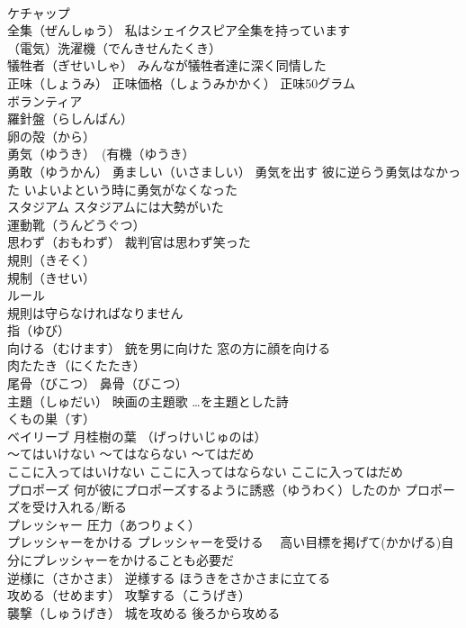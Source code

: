 \documentclass[8pt]{extreport}
\begin{document}
\begin{CJK}{UTF8}{min}
\\	ケチャップ
\\	全集（ぜんしゅう） 私はシェイクスピア全集を持っています
\\	（電気）洗濯機（でんきせんたくき）
\\	犠牲者（ぎせいしゃ） みんなが犠牲者達に深く同情した
\\	正味（しょうみ） 正味価格（しょうみかかく） 正味50グラム
\\	ボランティア
\\	羅針盤（らしんばん）
\\	卵の殻（から）
\\	勇気（ゆうき）　(有機（ゆうき） 
\\	勇敢（ゆうかん） 勇ましい（いさましい） 勇気を出す 彼に逆らう勇気はなかった いよいよという時に勇気がなくなった
\\	スタジアム スタジアムには大勢がいた
\\	運動靴（うんどうぐつ）
\\	思わず（おもわず） 裁判官は思わず笑った
\\	規則（きそく）
\\	規制（きせい）
\\	ルール 
\\	規則は守らなければなりません
\\	指（ゆび）
\\	向ける（むけます） 銃を男に向けた 窓の方に顔を向ける
\\	肉たたき（にくたたき）
\\	尾骨（びこつ） 鼻骨（びこつ）
\\	主題（しゅだい） 映画の主題歌 …を主題とした詩
\\	くもの巣（す）
\\	ベイリーブ 月桂樹の葉 （げっけいじゅのは）
\\	～てはいけない ～てはならない ～てはだめ 
\\	ここに入ってはいけない ここに入ってはならない ここに入ってはだめ
\\	プロポーズ 何が彼にプロポーズするように誘惑（ゆうわく）したのか プロポーズを受け入れる/断る
\\	プレッシャー 圧力（あつりょく）
\\	プレッシャーをかける プレッシャーを受ける　 高い目標を掲げて(かかげる)自分にプレッシャーをかけることも必要だ
\\	逆様に（さかさま） 逆様する ほうきをさかさまに立てる
\\	攻める（せめます） 攻撃する（こうげき）
\\	襲撃（しゅうげき） 城を攻める 後ろから攻める

\end{CJK}
\end{document}
